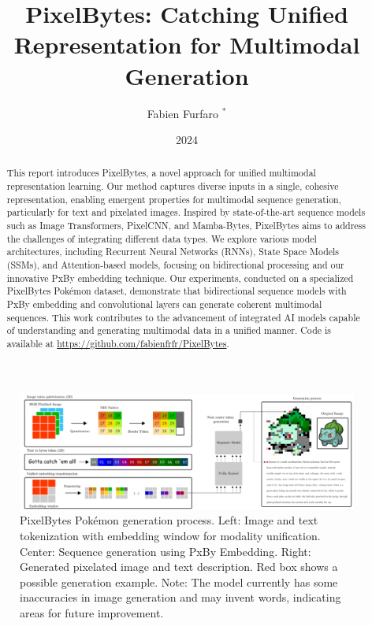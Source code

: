 \documentclass[10pt,a4paper]{article}
\title{\Large\textbf{PixelBytes: Catching Unified Representation for Multimodal Generation}}
\author{\large Fabien Furfaro $^{*}$}
\date{\large 2024}
\begin{document}
\maketitle


\begin{abstract}
This report introduces PixelBytes, a novel approach for unified multimodal representation learning. Our method captures diverse inputs in a single, cohesive representation, enabling emergent properties for multimodal sequence generation, particularly for text and pixelated images. Inspired by state-of-the-art sequence models such as Image Transformers, PixelCNN, and Mamba-Bytes, PixelBytes aims to address the challenges of integrating different data types. We explore various model architectures, including Recurrent Neural Networks (RNNs), State Space Models (SSMs), and Attention-based models, focusing on bidirectional processing and our innovative PxBy embedding technique. Our experiments, conducted on a specialized PixelBytes Pokémon dataset, demonstrate that bidirectional sequence models with PxBy embedding and convolutional layers can generate coherent multimodal sequences. This work contributes to the advancement of integrated AI models capable of understanding and generating multimodal data in a unified manner. Code is available at \url{https://github.com/fabienfrfr/PixelBytes}.
\end{abstract}

\let\thefootnote\relax{}


\begin{figure}[h]
\centering
\includegraphics[width=0.8\linewidth]{approach_generation.png}
\caption{PixelBytes Pokémon generation process. Left: Image and text tokenization with embedding window for modality unification. Center: Sequence generation using PxBy Embedding. Right: Generated pixelated image and text description. Red box shows a possible generation example. Note: The model currently has some inaccuracies in image generation and may invent words, indicating areas for future improvement.}
\label{fig:approach_generation}
\end{figure}
\end{document}
